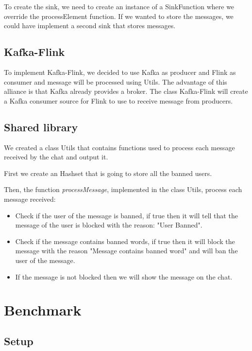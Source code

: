 \documentclass[utf8,9pt]{extarticle}
\begin{document}
\hspace{2 mm} To create the sink, we need to create an instance of a SinkFunction where we override the processElement function. If we wanted to store the messages, we could have implement a second sink that stores messages.

\subsection{Kafka-Flink}

\hspace{2 mm} To implement Kafka-Flink, we decided to use Kafka as producer and Flink as consumer and message will be processed using Utils.
The advantage of this alliance is that Kafka already provides a broker.
The class Kafka-Flink will create a Kafka consumer source for Flink to use to receive message from producers.


\subsection{Shared library}
\hspace{2mm} We created a class Utils that contains functions used to process each message received by the chat and output it.

First we create an Hashset that is going to store all the banned users.

Then, the function \textit{processMessage}, implemented in the class Utils, process each message received:
\begin{itemize}
    \item Check if the user of the message is banned, if true then it will tell that the message of the user is blocked with the reason: "User Banned".
    \item Check if the message contains banned words, if true then it will block the message with the reason "Message contains banned word" and will ban the user of the message.
    \item If the message is not blocked then we will show the message on the chat.
\end{itemize}



\section{Benchmark}

\subsection{Setup}
\end{document}
